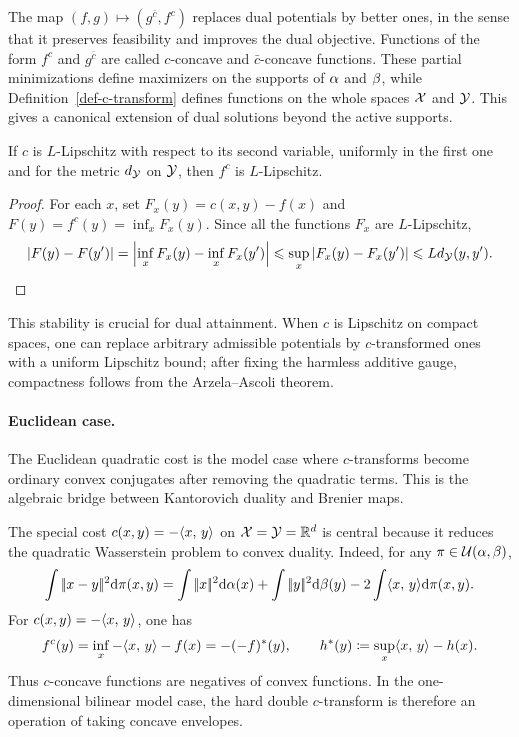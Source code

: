 The map $(f,g)\mapsto(g^{\bar c},f^c)$ replaces dual potentials by better ones, in the sense that it preserves feasibility and improves the dual objective. Functions of the form $f^c$ and $g^{\bar c}$ are called $c$-concave and $\bar c$-concave functions. These partial minimizations define maximizers on the supports of $\alpha$ and $\beta$, while Definition~\ref{def-c-transform} defines functions on the whole spaces $\mathcal{X}$ and $\mathcal{Y}$. This gives a canonical extension of dual solutions beyond the active supports.

\begin{prop}\label{prop-c-transform-lipschitz}
	If $c$ is $L$-Lipschitz with respect to its second variable, uniformly in the first one and for the metric $d_{\mathcal{Y}}$ on $\mathcal{Y}$, then $f^c$ is $L$-Lipschitz.
\end{prop}
\begin{proof}
	For each $x$, set $F_x(y)=c(x,y)-f(x)$ and $F(y)=f^c(y)=\inf_x F_x(y)$. Since all the functions $F_x$ are $L$-Lipschitz,
	\[
		|F(y)-F(y')|
		=
		\left|\inf_x F_x(y)-\inf_x F_x(y')\right|
		\leqslant
		\sup_x |F_x(y)-F_x(y')|
		\leqslant
		L d_{\mathcal{Y}}(y,y').
	\]
\end{proof}

This stability is crucial for dual attainment. When $c$ is Lipschitz on compact spaces, one can replace arbitrary admissible potentials by $c$-transformed ones with a uniform Lipschitz bound; after fixing the harmless additive gauge, compactness follows from the Arzela--Ascoli theorem.

\paragraph{Euclidean case.}

The Euclidean quadratic cost is the model case where $c$-transforms become ordinary convex conjugates after removing the quadratic terms. This is the algebraic bridge between Kantorovich duality and Brenier maps.

The special cost $c(x,y)=-\langle x,\,y\rangle$ on $\mathcal{X}=\mathcal{Y}=\mathbb{R}^d$ is central because it reduces the quadratic Wasserstein problem to convex duality. Indeed, for any $\pi\in\mathcal{U}(\alpha,\beta)$,
\[
	\int |\!| x-y |\!|^2\mathrm{d}\pi(x,y)
	=
	\int|\!| x |\!|^2\mathrm{d}\alpha(x)+\int|\!| y |\!|^2\mathrm{d}\beta(y)
	-2\int \langle x,\,y\rangle\mathrm{d}\pi(x,y).
\]
For $c(x,y)=-\langle x,\,y\rangle$, one has
\[
	f^c(y)
	=
	\inf_x -\langle x,\,y\rangle-f(x)
	=
	-(-f)^*(y),
	\qquad
	h^*(y)\coloneqq\sup_x \langle x,\,y\rangle-h(x).
\]
Thus $c$-concave functions are negatives of convex functions. In the one-dimensional bilinear model case, the hard double $c$-transform is therefore an operation of taking concave envelopes.

